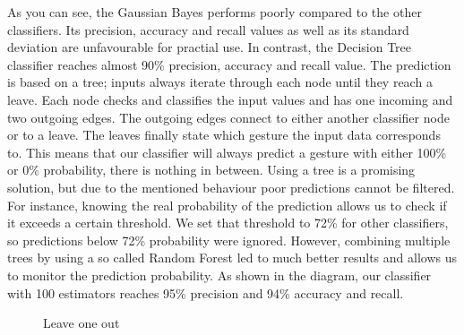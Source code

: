 As you can see, the Gaussian Bayes performs poorly compared to the other classifiers. Its precision, accuracy and recall values as well as its standard deviation are unfavourable for practial use. In contrast, the Decision Tree classifier reaches almost 90\% precision, accuracy and recall value. The prediction is based on a tree; inputs always iterate through each node until they reach a leave. Each node checks and classifies the input values and has one incoming and two outgoing edges. The outgoing edges connect to either another classifier node or to a leave. The leaves finally state which gesture the input data corresponds to. This means that our classifier will always predict a gesture with either 100\% or 0\% probability, there is nothing in between. Using a tree is a promising solution, but due to the mentioned behaviour poor predictions cannot be filtered. For instance, knowing the real probability of the prediction allows us to check if it exceeds a certain threshold. We set that threshold to 72\% for other classifiers, so predictions below 72\% probability were ignored. However, combining multiple trees by using a so called Random Forest led to much better results and allows us to monitor the prediction probability. As shown in the diagram, our classifier with 100 estimators reaches 95\% precision and 94\% accuracy and recall. 
\newline
\begin{figure}[H]
\caption{Leave one out}\label{fig:loo}
\end{figure}

